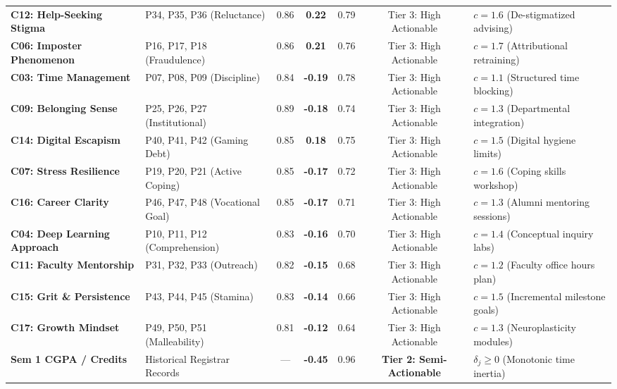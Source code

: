 \documentclass[10pt,a4paper]{article}
\begin{document}
\begin{table}[h!]
\begin{tabularx}{\textwidth}{p{3.2cm}p{3.1cm}cccc>{\raggedright\arraybackslash}X}
\rowcolor{RedLight} \textbf{C12: Help-Seeking Stigma} & P34, P35, P36 (Reluctance) & 0.86 & \textbf{0.22} & 0.79 & Tier 3: High Actionable & $c = 1.6$ (De-stigmatized advising) \\
\rowcolor{CanvasBG} \textbf{C06: Imposter Phenomenon} & P16, P17, P18 (Fraudulence) & 0.86 & \textbf{0.21} & 0.76 & Tier 3: High Actionable & $c = 1.7$ (Attributional retraining) \\
\rowcolor{BlueLight} \textbf{C03: Time Management} & P07, P08, P09 (Discipline) & 0.84 & \textbf{-0.19} & 0.78 & Tier 3: High Actionable & $c = 1.1$ (Structured time blocking) \\
\rowcolor{CanvasBG} \textbf{C09: Belonging Sense} & P25, P26, P27 (Institutional) & 0.89 & \textbf{-0.18} & 0.74 & Tier 3: High Actionable & $c = 1.3$ (Departmental integration) \\
\rowcolor{RedLight} \textbf{C14: Digital Escapism} & P40, P41, P42 (Gaming Debt) & 0.85 & \textbf{0.18} & 0.75 & Tier 3: High Actionable & $c = 1.5$ (Digital hygiene limits) \\
\rowcolor{BlueLight} \textbf{C07: Stress Resilience} & P19, P20, P21 (Active Coping) & 0.85 & \textbf{-0.17} & 0.72 & Tier 3: High Actionable & $c = 1.6$ (Coping skills workshop) \\
\rowcolor{CanvasBG} \textbf{C16: Career Clarity} & P46, P47, P48 (Vocational Goal) & 0.85 & \textbf{-0.17} & 0.71 & Tier 3: High Actionable & $c = 1.3$ (Alumni mentoring sessions) \\
\rowcolor{CanvasBG} \textbf{C04: Deep Learning Approach} & P10, P11, P12 (Comprehension) & 0.83 & \textbf{-0.16} & 0.70 & Tier 3: High Actionable & $c = 1.4$ (Conceptual inquiry labs) \\
\rowcolor{CanvasBG} \textbf{C11: Faculty Mentorship} & P31, P32, P33 (Outreach) & 0.82 & \textbf{-0.15} & 0.68 & Tier 3: High Actionable & $c = 1.2$ (Faculty office hours plan) \\
\rowcolor{CanvasBG} \textbf{C15: Grit \& Persistence} & P43, P44, P45 (Stamina) & 0.83 & \textbf{-0.14} & 0.66 & Tier 3: High Actionable & $c = 1.5$ (Incremental milestone goals) \\
\rowcolor{CanvasBG} \textbf{C17: Growth Mindset} & P49, P50, P51 (Malleability) & 0.81 & \textbf{-0.12} & 0.64 & Tier 3: High Actionable & $c = 1.3$ (Neuroplasticity modules) \\
\midrule
\rowcolor{PurpleLight} \textbf{Sem 1 CGPA / Credits} & Historical Registrar Records & --- & \textbf{-0.45} & 0.96 & \textbf{Tier 2: Semi-Actionable} & $\delta_j \ge 0$ (Monotonic time inertia) \\

\end{tabularx}
\end{table}
\end{document}
